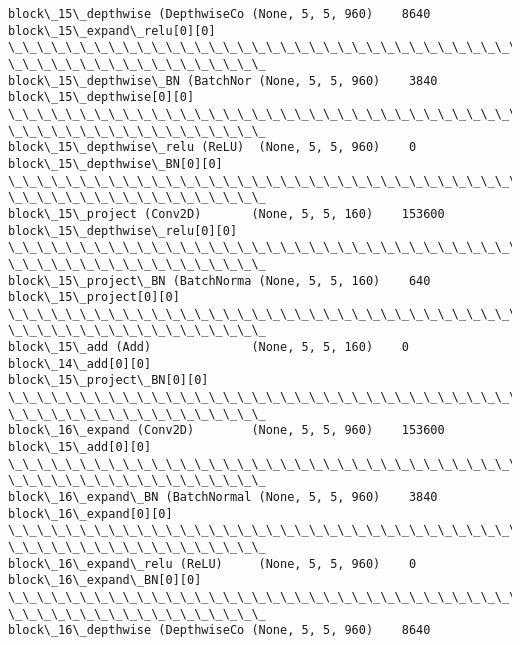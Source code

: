 \documentclass[11pt]{article}
\begin{document}
\begin{Verbatim}[commandchars=\\\{\}]
block\_15\_depthwise (DepthwiseCo (None, 5, 5, 960)    8640
block\_15\_expand\_relu[0][0]
\_\_\_\_\_\_\_\_\_\_\_\_\_\_\_\_\_\_\_\_\_\_\_\_\_\_\_\_\_\_\_\_\_\_\_\_\_\_\_\_\_\_\_\_\_\_\_\_\_\_\_\_\_\_\_\_\_\_\_\_\_\_\_\_\_\_\_\_\_\_\_\_\_\_\_\_\_\_\_\_
\_\_\_\_\_\_\_\_\_\_\_\_\_\_\_\_\_\_
block\_15\_depthwise\_BN (BatchNor (None, 5, 5, 960)    3840
block\_15\_depthwise[0][0]
\_\_\_\_\_\_\_\_\_\_\_\_\_\_\_\_\_\_\_\_\_\_\_\_\_\_\_\_\_\_\_\_\_\_\_\_\_\_\_\_\_\_\_\_\_\_\_\_\_\_\_\_\_\_\_\_\_\_\_\_\_\_\_\_\_\_\_\_\_\_\_\_\_\_\_\_\_\_\_\_
\_\_\_\_\_\_\_\_\_\_\_\_\_\_\_\_\_\_
block\_15\_depthwise\_relu (ReLU)  (None, 5, 5, 960)    0
block\_15\_depthwise\_BN[0][0]
\_\_\_\_\_\_\_\_\_\_\_\_\_\_\_\_\_\_\_\_\_\_\_\_\_\_\_\_\_\_\_\_\_\_\_\_\_\_\_\_\_\_\_\_\_\_\_\_\_\_\_\_\_\_\_\_\_\_\_\_\_\_\_\_\_\_\_\_\_\_\_\_\_\_\_\_\_\_\_\_
\_\_\_\_\_\_\_\_\_\_\_\_\_\_\_\_\_\_
block\_15\_project (Conv2D)       (None, 5, 5, 160)    153600
block\_15\_depthwise\_relu[0][0]
\_\_\_\_\_\_\_\_\_\_\_\_\_\_\_\_\_\_\_\_\_\_\_\_\_\_\_\_\_\_\_\_\_\_\_\_\_\_\_\_\_\_\_\_\_\_\_\_\_\_\_\_\_\_\_\_\_\_\_\_\_\_\_\_\_\_\_\_\_\_\_\_\_\_\_\_\_\_\_\_
\_\_\_\_\_\_\_\_\_\_\_\_\_\_\_\_\_\_
block\_15\_project\_BN (BatchNorma (None, 5, 5, 160)    640
block\_15\_project[0][0]
\_\_\_\_\_\_\_\_\_\_\_\_\_\_\_\_\_\_\_\_\_\_\_\_\_\_\_\_\_\_\_\_\_\_\_\_\_\_\_\_\_\_\_\_\_\_\_\_\_\_\_\_\_\_\_\_\_\_\_\_\_\_\_\_\_\_\_\_\_\_\_\_\_\_\_\_\_\_\_\_
\_\_\_\_\_\_\_\_\_\_\_\_\_\_\_\_\_\_
block\_15\_add (Add)              (None, 5, 5, 160)    0
block\_14\_add[0][0]
block\_15\_project\_BN[0][0]
\_\_\_\_\_\_\_\_\_\_\_\_\_\_\_\_\_\_\_\_\_\_\_\_\_\_\_\_\_\_\_\_\_\_\_\_\_\_\_\_\_\_\_\_\_\_\_\_\_\_\_\_\_\_\_\_\_\_\_\_\_\_\_\_\_\_\_\_\_\_\_\_\_\_\_\_\_\_\_\_
\_\_\_\_\_\_\_\_\_\_\_\_\_\_\_\_\_\_
block\_16\_expand (Conv2D)        (None, 5, 5, 960)    153600
block\_15\_add[0][0]
\_\_\_\_\_\_\_\_\_\_\_\_\_\_\_\_\_\_\_\_\_\_\_\_\_\_\_\_\_\_\_\_\_\_\_\_\_\_\_\_\_\_\_\_\_\_\_\_\_\_\_\_\_\_\_\_\_\_\_\_\_\_\_\_\_\_\_\_\_\_\_\_\_\_\_\_\_\_\_\_
\_\_\_\_\_\_\_\_\_\_\_\_\_\_\_\_\_\_
block\_16\_expand\_BN (BatchNormal (None, 5, 5, 960)    3840
block\_16\_expand[0][0]
\_\_\_\_\_\_\_\_\_\_\_\_\_\_\_\_\_\_\_\_\_\_\_\_\_\_\_\_\_\_\_\_\_\_\_\_\_\_\_\_\_\_\_\_\_\_\_\_\_\_\_\_\_\_\_\_\_\_\_\_\_\_\_\_\_\_\_\_\_\_\_\_\_\_\_\_\_\_\_\_
\_\_\_\_\_\_\_\_\_\_\_\_\_\_\_\_\_\_
block\_16\_expand\_relu (ReLU)     (None, 5, 5, 960)    0
block\_16\_expand\_BN[0][0]
\_\_\_\_\_\_\_\_\_\_\_\_\_\_\_\_\_\_\_\_\_\_\_\_\_\_\_\_\_\_\_\_\_\_\_\_\_\_\_\_\_\_\_\_\_\_\_\_\_\_\_\_\_\_\_\_\_\_\_\_\_\_\_\_\_\_\_\_\_\_\_\_\_\_\_\_\_\_\_\_
\_\_\_\_\_\_\_\_\_\_\_\_\_\_\_\_\_\_
block\_16\_depthwise (DepthwiseCo (None, 5, 5, 960)    8640

\end{Verbatim}
\end{document}
